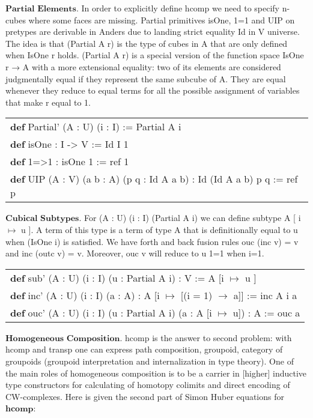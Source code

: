 \documentclass{article}
\theoremstyle{definition}
\newcommand{\tabstyle}[0]{\scriptsize\ttfamily\fontseries{l}\selectfont}
\begin{document}
\newpage
$\textbf{Partial\ Elements}$. In order to explicitly define hcomp we need to specify
n-cubes where some faces are missing. Partial primitives isOne, 1=1 and UIP on pretypes
are derivable in Anders due to landing strict equality Id in V universe. The idea is
that (Partial A r) is the type of cubes in A that are only defined when IsOne r holds.
(Partial A r) is a special version of the function space IsOne r → A with a more
extensional equality: two of its elements are considered judgmentally equal if
they represent the same subcube of A. They are equal whenever they reduce to
equal terms for all the possible assignment of variables that make r equal to 1.

\begin{table}[ht]
\tabstyle
\begin{tabular}{l}
\textbf{def} Partial' (A : U) (i : I) := Partial A i \\
\textbf{def} isOne : I -> V := Id I 1 \\
\textbf{def} 1=>1 : isOne 1 := ref 1 \\
\textbf{def} UIP (A : V) (a b : A) (p q : Id A a b) : Id (Id A a b) p q := ref p \\
\end{tabular}
\end{table}

$\textbf{Cubical\ Subtypes}$. For (A : U) (i : I) (Partial A i) we can define
subtype A [ i $\mapsto$ u ]. A term of this type is a term of type A that is
definitionally equal to u when (IsOne i) is satisfied. We have forth and back
fusion rules ouc (inc v) = v and inc (outc v) = v. Moreover, ouc v will reduce to u 1=1 when i=1.

\begin{table}[ht]
\tabstyle
\begin{tabular}{l}
\textbf{def} sub' (A : U) (i : I) (u : Partial A i) : V := A [i $\mapsto$ u ] \\
\textbf{def} inc' (A : U) (i : I) (a : A) : A [i $\mapsto$ [(i = 1) $\rightarrow$ a]] := inc A i a \\
\textbf{def} ouc' (A : U) (i : I) (u : Partial A i) (a : A [i $\mapsto$ u]) : A := ouc a \\
\end{tabular}
\end{table}

$\textbf{Homogeneous\ Composition}$. hcomp is the answer to second problem: with hcomp and transp
one can express path composition, groupoid, category of groupoids (groupoid interpretation and
internalization in type theory). One of the main roles of homogeneous composition is to be a
carrier in [higher] inductive type constructors for calculating of homotopy colimits and direct
encoding of CW-complexes. Here is given the second part of Simon Huber equations \cite{Huber} for $\textbf{hcomp}$:
\end{document}
